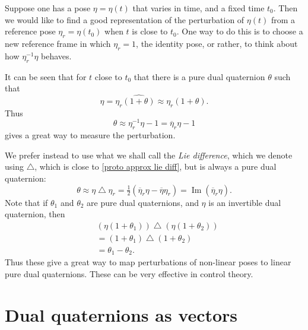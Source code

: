\documentclass[reqno,12pt]{amsart}
\DeclareMathOperator\imagpart{Im}
\newcommand{\liediff}{\mathbin{\triangle}}
\begin{document}
Suppose one has a pose $\eta = \eta(t)$ that varies in time, and a fixed time $t_0$.  Then we would like to find a good representation of the perturbation of $\eta(t)$ from a reference pose $\eta_r = \eta(t_0)$ when $t$ is close to $t_0$.  One way to do this is to choose a new reference frame in which $\eta_r = 1$, the identity pose, or rather, to think about how $\eta_r ^{-1} \eta$ behaves.

It can be seen that for $t$ close to $t_0$ that there is a pure dual quaternion $\theta$ such that
\begin{equation}
\eta = \eta_r \widehat{(1 + \theta)} \approx \eta_r (1 + \theta) .
\end{equation}
Thus
\begin{equation}
\label{proto approx lie diff}
\theta \approx \eta_r^{-1} \eta - 1 = \overline\eta_r \eta - 1
\end{equation}
gives a great way to measure the perturbation.

We prefer instead to use what we shall call the \emph{Lie difference}, which we denote using $\liediff$, which is close to \eqref{proto approx lie diff}, but is always a pure dual quaternion:
\begin{equation}
\theta \approx \eta\liediff\eta_r = \tfrac12 (\overline\eta_r \eta - \overline\eta \eta_r) = \imagpart(\overline\eta_r \eta).
\end{equation}
Note that if $\theta_1$ and $\theta_2$ are pure dual quaternions, and $\eta$ is an invertible dual quaternion, then
\begin{equation}
\label{approx approx lie diff}
\begin{aligned}
&(\eta(1+\theta_1)) \liediff (\eta(1+\theta_2)) \\&= (1+\theta_1) \liediff (1+\theta_2) \\&= \theta_1 - \theta_2 .
\end{aligned}
\end{equation}
Thus these give a great way to map perturbations of non-linear poses to linear pure dual quaternions.  These can be very effective in control theory.

\section{Dual quaternions as vectors}
\end{document}
